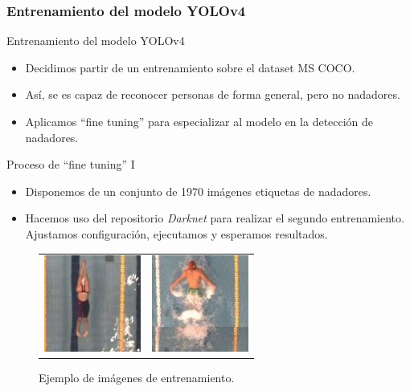 \documentclass[11pt]{beamer}
\begin{document}
        \subsubsection{Entrenamiento del modelo YOLOv4}
        \begin{frame}{Entrenamiento del modelo YOLOv4}
            \begin{itemize}
                \item Decidimos partir de un entrenamiento sobre el dataset MS COCO.
                \item Así, se es capaz de reconocer personas de forma general, pero no nadadores.
                \item Aplicamos ``fine tuning'' para especializar al modelo en la detección de nadadores.
            \end{itemize}
        \end{frame}
        
        \begin{frame}{Proceso de ``fine tuning'' I }
            \begin{itemize}
                \item Disponemos de un conjunto de 1970 imágenes etiquetas de nadadores.
                \item Hacemos uso del repositorio \textit{Darknet} para realizar el segundo entrenamiento. Ajustamos configuración, ejecutamos y esperamos resultados.
            \end{itemize}
            \begin{figure}[h!]
                \centering
                    \begin{tabular}{cc}
                        \includegraphics[scale=0.6]{imagenes/aspa_0179.jpg} &
                        \includegraphics[scale=0.6]{imagenes/cm_428.jpg} 
                    \end{tabular}
                \caption{Ejemplo de imágenes de entrenamiento.}
                \label{fig:imagenesentrenamiento}
            \end{figure}
        \end{frame}
        
\end{document}
